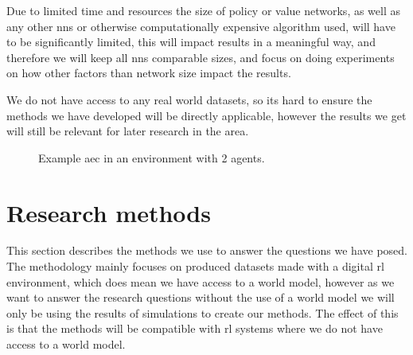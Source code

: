 \documentclass[UKenglish]{uiomasterthesis}
\begin{document}
Due to limited time and resources the size of policy or value networks, as well as any other \acp{nn} or otherwise computationally expensive algorithm used, will have to be significantly limited, this will impact results in a meaningful way, and therefore we will keep all \acp{nn} comparable sizes, and focus on doing experiments on how other factors than network size impact the results.

We do not have access to any real world datasets, so its hard to ensure the methods we have developed will be directly applicable, however the results we get will still be relevant for later research in the area.
\begin{figure}[H]
\begin{center}


\caption{Example \ac{aec} in an environment with 2 agents.}
\label{fig:aec}
\end{center}
\end{figure}

\section{Research methods}
\label{sec:research}
This section describes the methods we use to answer the questions we have posed. The methodology mainly focuses on produced datasets made with a digital \ac{rl} environment, which does mean we have access to a world model, however as we want to answer the research questions without the use of a world model we will only be using the results of simulations to create our methods. The effect of this is that the methods will be compatible with \ac{rl} systems where we do not have access to a world model.
\end{document}
